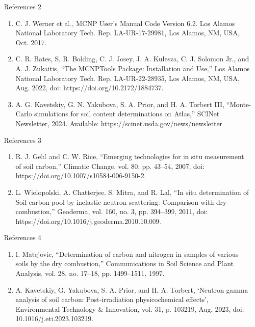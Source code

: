 \documentclass[10pt,hyperref={colorlinks,citecolor=blue,urlcolor=peking_blue,linkcolor=}]{beamer}
\theoremstyle{plain}
\begin{document}
\begin{frame}{References 2}
\begin{enumerate}
\item C. J. Werner et al., MCNP User's Manual Code Version 6.2. Los Alamos National Laboratory Tech. Rep. LA-UR-17-29981, Los Alamos, NM, USA, Oct. 2017.
\item C. R. Bates, S. R. Bolding, C. J. Josey, J. A. Kulesza, C. J. Solomon Jr., and A. J. Zukaitis, ``The MCNPTools Package: Installation and Use,'' Los Alamos National Laboratory Tech. Rep. LA-UR-22-28935, Los Alamos, NM, USA, Aug. 2022, doi: https://doi.org/10.2172/1884737.
\item A. G. Kavetskiy, G. N. Yakubova, S. A. Prior, and H. A. Torbert III, ``Monte-Carlo simulations for soil content determinations on Atlas,'' SCINet Newsletter, 2024. Available: https://scinet.usda.gov/news/newsletter
\end{enumerate}
\end{frame}
\begin{frame}{References 3}
\begin{enumerate}
\item R. J. Gehl and C. W. Rice, ``Emerging technologies for in situ measurement of soil carbon,'' Climatic Change, vol. 80, pp. 43--54, 2007, doi: https://doi.org/10.1007/s10584-006-9150-2.
\item L. Wielopolski, A. Chatterjee, S. Mitra, and R. Lal, ``In situ determination of Soil carbon pool by inelastic neutron scattering: Comparison with dry combustion,'' Geoderma, vol. 160, no. 3, pp. 394--399, 2011, doi: https://doi.org/10.1016/j.geoderma.2010.10.009.
\end{enumerate}
\end{frame}
\begin{frame}{References 4}
\begin{enumerate}
\item I. Matejovic, ``Determination of carbon and nitrogen in samples of various soils by the dry combustion,'' Communications in Soil Science and Plant Analysis, vol. 28, no. 17--18, pp. 1499--1511, 1997.
\item A. Kavetskiy, G. Yakubova, S. A. Prior, and H. A. Torbert, ‘Neutron gamma analysis of soil carbon: Post-irradiation physicochemical effects’, Environmental Technology & Innovation, vol. 31, p. 103219, Aug. 2023, doi: 10.1016/j.eti.2023.103219.
\end{enumerate}
\end{frame}
\end{document}
